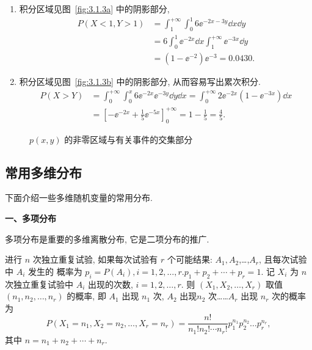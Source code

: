    \begin{solution}
  		\begin{enumerate}
  		\item 积分区域见图~\ref{fig:3.1.3a} 中的阴影部分, 
  		\begin{align*} 
  		 P(X<1, Y>1) &=\int_{1}^{+\infty} \int_{0}^{1} 6 \ee^{-2 x-3 y} \dd x \dd y \\
  		 &=6 \int_{0}^{1} \ee^{-2 x} \dd x \int_{1}^{+\infty} \ee^{-3 x} \dd y \\ 
  		 &=\left(1-\ee^{-2}\right) \ee^{-3}=0.0430. 
  		\end{align*}
  		\item 积分区域见图~\ref{fig:3.1.3b} 中的阴影部分, 从而容易写出累次积分.
  		\begin{align*} 
  		 P(X>Y) &=\int_{0}^{+\infty} \int_{0}^{x} 6 \ee^{-2 x} \ee^{-3 y} \dd y \dd x=
  		 \int_{0}^{+\infty} 2 \ee^{-2 x}\left(1-\ee^{-3 x}\right) \dd x \\ 
  		 &=\left[-\ee^{-2 x}+\frac{1}{5} \ee^{-5 x}\right]_{0}^{+\infty}=1-\frac{1}{5}=\frac{4}{5} .
  		\end{align*}
  		\end{enumerate}             
   \end{solution}
   \begin{figure}[htbp]
   \centering
   \qquad
   \caption{$p(x,y)$ 的非零区域与有关事件的交集部分}\label{fig:3.1.3}
   \end{figure}
   
  \subsection{常用多维分布}\label{ssec:3.1.5}
  下面介绍一些多维随机变量的常用分布. 
   
  \textbf{一、多项分布 }
   
  多项分布是重要的多维离散分布, 它是二项分布的推广.
  
  进行 $n$ 次独立重复试验, 如果每次试验有 $r$ 个可能结果: $A_1, A_2$,\ldots,$A_r$, 且每次试验中 $A_i$ 发生的
  概率为 $p_{i}=P\left(A_{i}\right), i=1,2, \ldots, r . p_{1}+p_{2}+\cdots+p_{r}=1$.
  记 $X_i$ 为 $n$ 次独立重复试验中 $A_i$ 出现的次数, $i=1,2,\ldots,r$. 则 $(X_1,X_2,\ldots,X_r)$ 
  取值 $(n_1,n_2,\ldots,n_r)$ 的概率, 即 $A_1$ 出现 $n_1$ 次, $A_2$ 出现$n_2$ 次\ldots\ldots $A_r$ 出现 $n_r$ 次的概率为
  \begin{equation}
	  P\left(X_{1}=n_{1}, X_{2}=n_{2}, \ldots, X_{r}=n_{r}\right)=\frac{n !}{n_{1} ! n_{2} ! \cdots n_{r} !} p_{1}^{n_{1}} p_{2}^{n_{2}} \ldots p_{r}^{n_r},
  \end{equation}
  其中 $n=n_1+n_2+\cdots+n_r$.
  
